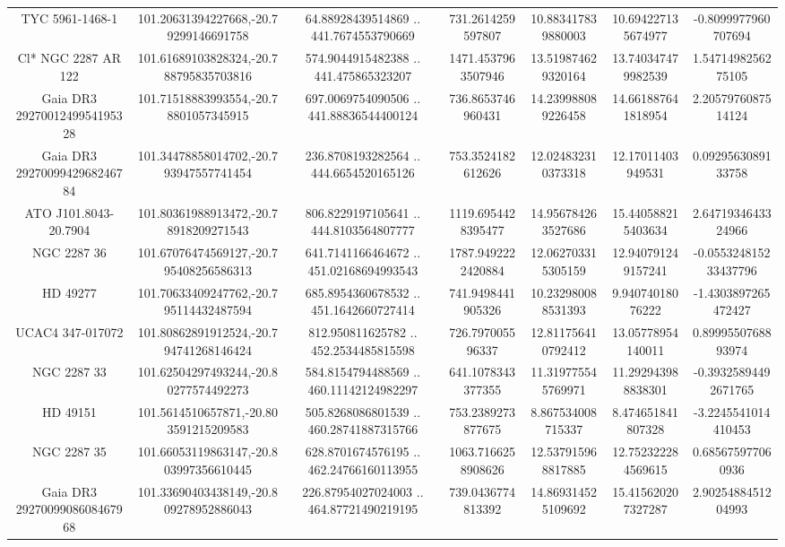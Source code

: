 \begin{table}
\begin{tabular}{ccccccc}
TYC 5961-1468-1 & 101.20631394227668,-20.79299146691758 & 64.88928439514869 .. 441.7674553790669 & 731.2614259597807 & 10.883417839880003 & 10.694227135674977 & -0.8099977960707694 \\
Cl* NGC 2287     AR     122 & 101.61689103828324,-20.788795835703816 & 574.9044915482388 .. 441.475865323207 & 1471.4537963507946 & 13.519874629320164 & 13.740347479982539 & 1.5471498256275105 \\
Gaia DR3 2927001249954195328 & 101.71518883993554,-20.78801057345915 & 697.0069754090506 .. 441.88836544400124 & 736.8653746960431 & 14.239988089226458 & 14.661887641818954 & 2.2057976087514124 \\
Gaia DR3 2927009942968246784 & 101.34478858014702,-20.793947557741454 & 236.8708193282564 .. 444.6654520165126 & 753.3524182612626 & 12.024832310373318 & 12.17011403949531 & 0.0929563089133758 \\
ATO J101.8043-20.7904 & 101.80361988913472,-20.78918209271543 & 806.8229197105641 .. 444.8103564807777 & 1119.6954428395477 & 14.956784263527686 & 15.440588215403634 & 2.6471934643324966 \\
NGC  2287    36 & 101.67076474569127,-20.795408256586313 & 641.7141166464672 .. 451.02168694993543 & 1787.9492222420884 & 12.062703315305159 & 12.940791249157241 & -0.055324815233437796 \\
HD  49277 & 101.70633409247762,-20.795114432487594 & 685.8954360678532 .. 451.1642660727414 & 741.9498441905326 & 10.232980088531393 & 9.94074018076222 & -1.4303897265472427 \\
UCAC4 347-017072 & 101.80862891912524,-20.794741268146424 & 812.950811625782 .. 452.2534485815598 & 726.797005596337 & 12.811756410792412 & 13.05778954140011 & 0.8999550768893974 \\
NGC  2287    33 & 101.62504297493244,-20.80277574492273 & 584.8154794488569 .. 460.11142124982297 & 641.1078343377355 & 11.319775545769971 & 11.292943988838301 & -0.39325894492671765 \\
HD  49151 & 101.5614510657871,-20.803591215209583 & 505.8268086801539 .. 460.28741887315766 & 753.2389273877675 & 8.867534008715337 & 8.474651841807328 & -3.2245541014410453 \\
NGC  2287    35 & 101.66053119863147,-20.803997356610445 & 628.8701674576195 .. 462.24766160113955 & 1063.7166258908626 & 12.537915968817885 & 12.752322284569615 & 0.685675977060936 \\
Gaia DR3 2927009908608467968 & 101.33690403438149,-20.809278952886043 & 226.87954027024003 .. 464.87721490219195 & 739.0436774813392 & 14.869314525109692 & 15.415620207327287 & 2.9025488451204993 \\

\end{tabular}
\end{table}

